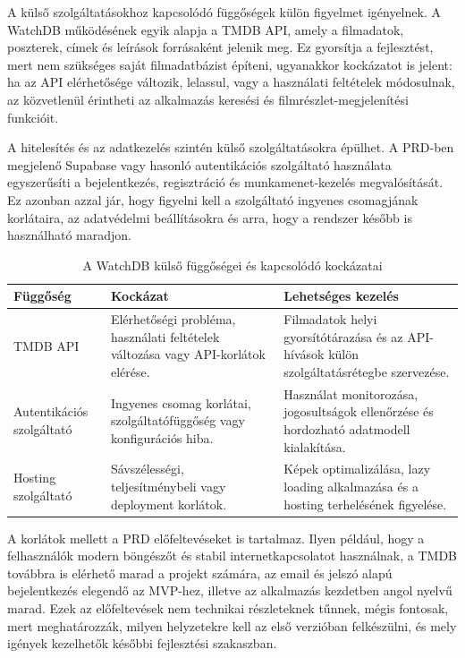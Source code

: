 A külső szolgáltatásokhoz kapcsolódó függőségek külön figyelmet igényelnek. A WatchDB működésének egyik alapja a TMDB API, amely a filmadatok, poszterek, címek és leírások forrásaként jelenik meg. Ez gyorsítja a fejlesztést, mert nem szükséges saját filmadatbázist építeni, ugyanakkor kockázatot is jelent: ha az API elérhetősége változik, lelassul, vagy a használati feltételek módosulnak, az közvetlenül érintheti az alkalmazás keresési és filmrészlet-megjelenítési funkcióit.

A hitelesítés és az adatkezelés szintén külső szolgáltatásokra épülhet. A PRD-ben megjelenő Supabase vagy hasonló autentikációs szolgáltató használata egyszerűsíti a bejelentkezés, regisztráció és munkamenet-kezelés megvalósítását. Ez azonban azzal jár, hogy figyelni kell a szolgáltató ingyenes csomagjának korlátaira, az adatvédelmi beállításokra és arra, hogy a rendszer később is használható maradjon.

\begin{table}[H]
\centering
\renewcommand{\arraystretch}{1.25}
\begin{tabular}{|p{}|p{}|p{}|}
\hline
\textbf{Függőség} & \textbf{Kockázat} & \textbf{Lehetséges kezelés} \\
\hline
TMDB API & Elérhetőségi probléma, használati feltételek változása vagy API-korlátok elérése. & Filmadatok helyi gyorsítótárazása és az API-hívások külön szolgáltatásrétegbe szervezése. \\
\hline
Autentikációs szolgáltató & Ingyenes csomag korlátai, szolgáltatófüggőség vagy konfigurációs hiba. & Használat monitorozása, jogosultságok ellenőrzése és hordozható adatmodell kialakítása. \\
\hline
Hosting szolgáltató & Sávszélességi, teljesítménybeli vagy deployment korlátok. & Képek optimalizálása, lazy loading alkalmazása és a hosting terhelésének figyelése. \\
\hline
\end{tabular}
\caption{A WatchDB külső függőségei és kapcsolódó kockázatai}
\label{tab:watchdb-dependencies}
\end{table}

A korlátok mellett a PRD előfeltevéseket is tartalmaz. Ilyen például, hogy a felhasználók modern böngészőt és stabil internetkapcsolatot használnak, a TMDB továbbra is elérhető marad a projekt számára, az email és jelszó alapú bejelentkezés elegendő az MVP-hez, illetve az alkalmazás kezdetben angol nyelvű marad. Ezek az előfeltevések nem technikai részleteknek tűnnek, mégis fontosak, mert meghatározzák, milyen helyzetekre kell az első verzióban felkészülni, és mely igények kezelhetők későbbi fejlesztési szakaszban.

